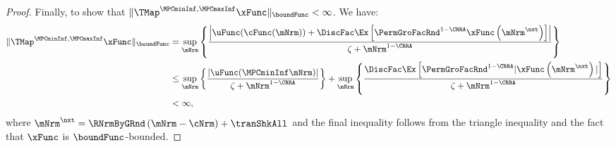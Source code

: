 \documentclass[\econtexRoot/BufferStockTheory]{subfiles}
\begin{document}
\begin{proof}
Finally, to show that $\Vert \TMap^{\MPCminInf, \MPCmaxInf}{\mathfrak{\xFunc}}\Vert_{\boundFunc}<\infty$.
We have:
%
%
\begin{equation}\begin{gathered}\begin{aligned}
\Vert \TMap^{\MPCminInf, \MPCmaxInf}{\mathfrak{\xFunc}}\Vert_{\boundFunc} & = \sup_{\mNrm} \left\{\frac{\left| \uFunc(\cFunc(\mNrm)) + \DiscFac \Ex\left[ {\PermGroFacRnd}^{1-\CRRA }{\mathfrak{\xFunc}} \left( {\mNrm^{\nxt}}\right) \right] \right|}{\zeta + \mNrm^{1-\CRRA}}\right\} \\
& \leq \sup_{\mNrm} \left\{\frac{\left|\uFunc(\MPCminInf\mNrm)\right|}{\zeta + \mNrm^{1-\CRRA}}\right\} + \sup_{\mNrm} \left\{\frac{\DiscFac \Ex\left[ {\PermGroFacRnd}^{1-\CRRA }{\vert \mathfrak{\xFunc}} \left( {\mNrm^{\nxt}}\right)\vert  \right]}{\zeta + \mNrm^{1-\CRRA}}\right\}\\
& <\infty,
\end{aligned}\end{gathered}\end{equation}
%
where ${\mNrm}^{\nxt} = \RNrmByGRnd\left(\mNrm - \cNrm\right) + \tranShkAll$ and the final inequality follows from the triangle inequality and the fact that $\xFunc$ is $\boundFunc$-bounded.

                                           
\end{proof}
\end{document}
